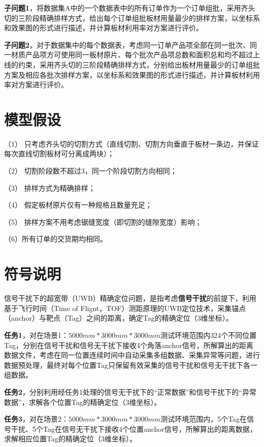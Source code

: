 \documentclass[bwprint]{gmcmthesis}
\begin{document}
\textbf{子问题1}，将数据集A中的一个数据表中的所有订单作为一个订单组批，采用齐头切的三阶段精确排样方式，给出每个订单组批板材用量最少的排样方案，以坐标系和效果图的形式进行描述，并计算板材利用率对方案进行评价。


\textbf{子问题2}，对于数据集中的每个数据表，考虑同一订单产品项全部在同一批次、同一材质产品项方可使用同一板材原片、每个批次产品项总数和面积总和均不超过上线的约束，采用齐头切的三阶段精确排样方式，分别给出板材用量最少的订单组批方案及相应各批次排样方案，以坐标系和效果图的形式进行描述，并计算板材利用率对方案进行评价。

\newpage

\section{模型假设}


（1） 只考虑齐头切的切割方式（直线切割、切割方向垂直于板材一条边，并保证每次直线切割板材可分离成两块）；


（2） 切割阶段数不超过3，同一个阶段切割方向相同；


（3） 排样方式为精确排样；


（4） 假定板材原片仅有一种规格且数量充足；


（5） 排样方案不用考虑锯缝宽度（即切割的缝隙宽度）影响；

（6）所有订单的交货期均相同。


\section{符号说明}

\quad


信号干扰下的超宽带（UWB）精确定位问题，是指考虑\textbf{信号干扰}的前提下，利用基于飞行时间（Time of Flignt，TOF）测距原理的UWB定位技术，采集锚点（anchor）与靶点（Tag）之间的距离，确定Tag的精确定位（3维坐标）。

\textbf{任务1}，对在场景1：$5000mm*3000mm*3000mm$测试环境范围内324个不同位置Tag，分别在信号干扰和信号无干扰下接收4个角落anchor信号，所解算出的距离数据文件，考虑在同一位置连续时间中自动采集多组数据、采集异常等问题，进行数据预处理，最终对每个位置Tag只保留有效采集的信号干扰和信号无干扰下各一组数据。

\textbf{任务2}，分别利用经任务1处理的信号无干扰下的“正常数据”和信号干扰下的“异常数据”，求解各个位置Tag的精确定位（3维坐标）。

\textbf{任务3}，对在场景2：$5000mm*3000mm*3000mm$测试环境范围内，5个Tag在信号干扰、5个Tag在信号无干扰下接收4个位置anchor信号，所解算出的距离数据，求解相应位置Tag的精确定位（3维坐标）。
\end{document}
